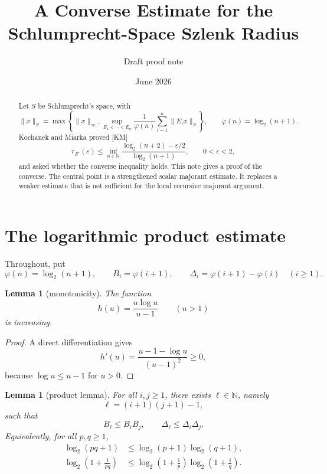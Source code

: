 \documentclass[11pt]{article}
\title{A Converse Estimate for the Schlumprecht-Space Szlenk Radius}
\author{Draft proof note}
\date{June 2026}
\newtheorem{lemma}[theorem]{Lemma}
\newcommand{\N}{\mathbb N}
\newcommand{\eps}{\varepsilon}
\newcommand{\ph}{\varphi}
\begin{document}
\maketitle

\begin{abstract}
Let $S$ be Schlumprecht's space, with
\[
 \|x\|_S=\max\left\{\|x\|_\infty,
 \sup_{E_1<\cdots<E_n}\frac1{\ph(n)}\sum_{i=1}^n\|E_i x\|_S\right\},
 \qquad \ph(n)=\log_2(n+1).
\]
Kochanek and Miarka proved [KM]
\[
 r_{S^*}(\eps)\le \inf_{n\in\N}
 \frac{\log_2(n+2)-\eps/2}{\log_2(n+1)},\qquad 0<\eps<2,
\]
and asked whether the converse inequality holds.  This note gives a proof of the converse.
The central point is a strengthened scalar majorant estimate.  It replaces a weaker estimate
that is not sufficient for the local recursive majorant argument.
\end{abstract}

\section{The logarithmic product estimate}

Throughout, put
\[
 \ph(n)=\log_2(n+1),\qquad
 B_i=\ph(i+1),\qquad
 \Delta_i=\ph(i+1)-\ph(i) \quad (i\ge 1).
\]

\begin{lemma}[monotonicity]
The function
\[
 h(u)=\frac{u\log u}{u-1}\qquad (u>1)
\]
is increasing.
\end{lemma}

\begin{proof}
A direct differentiation gives
\[
 h'(u)=\frac{u-1-\log u}{(u-1)^2}\ge 0,
\]
because $\log u\le u-1$ for $u>0$.
\end{proof}

\begin{lemma}[product lemma]
For all $i,j\ge 1$, there exists $\ell\in\N$, namely
\[
 \ell=(i+1)(j+1)-1,
\]
such that
\[
 B_\ell\le B_iB_j,
 \qquad
 \Delta_\ell\le \Delta_i\Delta_j.
\]
Equivalently, for all $p,q\ge 1$,
\begin{align}
 \log_2(pq+1)&\le \log_2(p+1)\log_2(q+1), \label{eq:prod-B}\\
 \log_2\left(1+\frac1{pq}\right)&\le
 \log_2\left(1+\frac1p\right)\log_2\left(1+\frac1q\right). \label{eq:prod-Delta}
\end{align}
\end{lemma}
\end{document}
